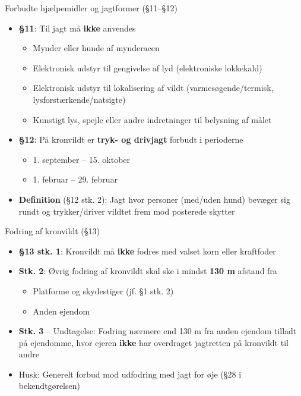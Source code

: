 \begin{frame}{Forbudte hjælpemidler og jagtformer (§11–§12)}
    \begin{itemize}
        \item \textbf{§11}: Til jagt må \textbf{ikke} anvendes
          \begin{itemize}
            \item Mynder eller hunde af mynderacen
            \item Elektronisk udstyr til gengivelse af lyd (elektroniske lokkekald)
            \item Elektronisk udstyr til lokalisering af vildt (varmesøgende/termisk, lysforstærkende/natsigte)
            \item Kunstigt lys, spejle eller andre indretninger til belysning af målet
          \end{itemize}
        \item \textbf{§12}: På kronvildt er \textbf{tryk- og drivjagt} forbudt i perioderne
          \begin{itemize}
            \item 1. september – 15. oktober
            \item 1. februar – 29. februar
          \end{itemize}
        \item \textbf{Definition} (§12 stk. 2): Jagt hvor personer (med/uden hund) bevæger sig rundt og trykker/driver vildtet frem mod posterede skytter
    \end{itemize}
\end{frame}

\begin{frame}{Fodring af kronvildt (§13)}
    \begin{itemize}
        \item \textbf{§13 stk. 1}: Kronvildt må \textbf{ikke} fodres med valset korn eller kraftfoder
        \item \textbf{Stk. 2}: Øvrig fodring af kronvildt skal ske i mindst \textbf{130 m} afstand fra
          \begin{itemize}
            \item Platforme og skydestiger (jf. §1 stk. 2)
            \item Anden ejendom
          \end{itemize}
        \item \textbf{Stk. 3} – Undtagelse: Fodring nærmere end 130 m fra anden ejendom tilladt på ejendomme, hvor ejeren \textbf{ikke} har overdraget jagtretten på kronvildt til andre
        \item Husk: Generelt forbud mod udfodring med jagt for øje (§28 i bekendtgørelsen)
    \end{itemize}
\end{frame}